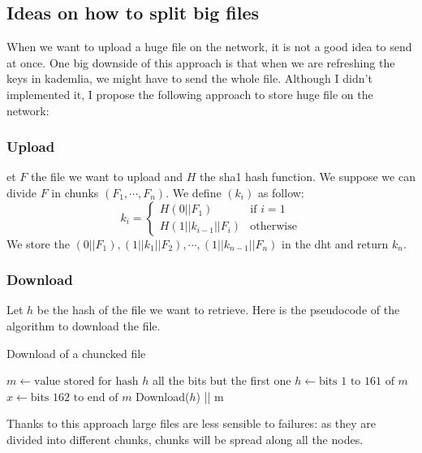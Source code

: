 \documentclass[a4paper]{article}
\begin{document}
\subsection{Ideas on how to split big files}

When we want to upload a huge file on the network, it is not a good idea to send at once. One big downside of this approach is that when we are refreshing the keys in kademlia, we might have to send the whole file. 
Although I didn't implemented it, I propose the following approach to store huge file on the network:
\subsubsection{Upload}
    et $F$ the file we want to upload and $H$ the sha1 hash function. We suppose we can divide $F$ in chunks $(F_1, \cdots, F_n)$. We define $(k_i)$ as follow:
        \[k_i =\left\{
	\begin{array}{ll}
        H(0 || F_1)  & \text{if } i = 1 \\
        H(1 || k_{i-1} || F_i) & \text{otherwise}
	\end{array}
\right.\]
        We store the $(0||F_1), (1||k_1||F_2), \cdots, (1||k_{n-1}||F_n)$ in the dht and return $k_n$.
        \subsubsection{Download}
        Let $h$ be the hash of the file we want to retrieve. Here is the pseudocode of the algorithm to download the file.

\begin{algorithm}
    \caption{Download of a chuncked file}\label{euclid}
\begin{algorithmic}[1]
\State $m \gets \text{value stored for hash } h$
    \State \Return all the bits but the first one
    \Else {}
        \State $h \gets \text{bits 1 to 161 of }m$ 
        \State $x \gets \text{bits 162 to end of }m$
        \State\Return Download($h$) || m
    \EndIf
\EndProcedure
\end{algorithmic}
\end{algorithm}

Thanks to this approach large files are less sensible to failures: as they are divided into different chunks, chunks will be spread along all the nodes.




\end{document}
